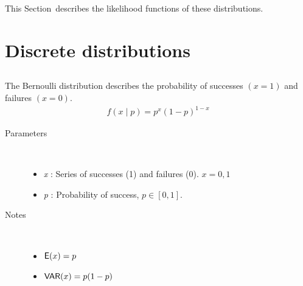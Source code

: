 \documentclass[]{jss}
\begin{document}
This Section~describes the likelihood functions of these distributions.

\section{Discrete distributions}

\subsection[bernoulli]{}
     
The Bernoulli distribution describes the probability of successes $(x=1)$ and
failures $(x=0)$.
\begin{eqnarray*}
    f(x \mid p) = p^{x} (1-p)^{1-x}
\end{eqnarray*}

\begin{description}
\item[Parameters] \ 

\begin{itemize}
\item {} 
\emph{x} : Series of successes (1) and failures (0). $x=0,1$

\item {} 
\emph{p} : Probability of success, $p \in [0,1]$.
\end{itemize}
\item[Notes] \ 
\begin{itemize}
\item {} 
$\mathsf{E}(x)= p$
\item {} 
$\mathsf{VAR}(x)= p(1-p)$
\end{itemize}
\end{description}


\subsection[binomial]{}
\end{document}
